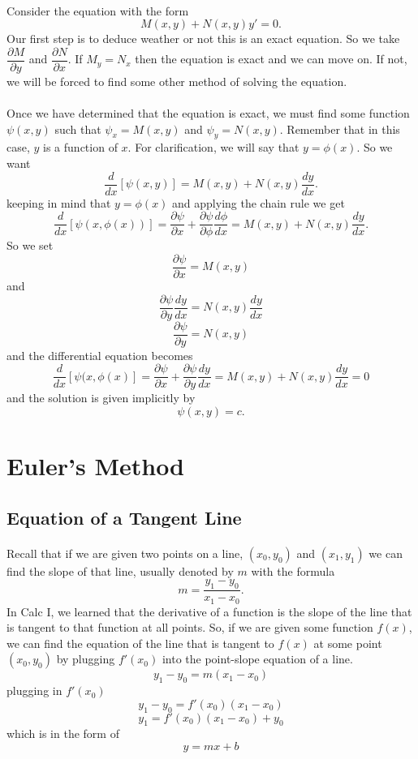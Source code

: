 \documentclass[font =22]{report}
\begin{document}
\paragraph{}
Consider the equation with the form 
\[
M(x,y) + N(x,y)y' = 0.
\]
Our first step is to deduce weather or not this is an exact equation. So we take
$\dfrac{\partial M}{\partial y}$ and $\dfrac{\partial N}{\partial x}$. If $M_y = N_x$ then the equation is exact and we can move on. If not, we will be forced to find some other method of solving the equation.  

\paragraph{}
Once we have determined that the equation is exact, we must find some function $\psi(x,y)$ such that $\psi_x = M(x,y)$ and $\psi_y = N(x,y)$. Remember that in this case, $y$ is a function of $x$. For clarification, we will say that $y=\phi(x)$. So we want 
\[
\frac{d}{dx}\left[\psi(x,y)\right] = M(x,y) + N(x,y)\frac{dy}{dx}.
\]
keeping in mind that $y = \phi(x)$ and applying the chain rule we get
\[
\frac{d}{dx}\left[\psi(x,\phi(x))\right] = \frac{\partial \psi}{\partial x} + \frac{\partial \psi}{\partial \phi}\frac{d \phi}{dx} = M(x,y) + N(x,y)\frac{dy}{dx}.
\]
So we set 
\[
\frac{\partial \psi}{\partial x} = M(x,y)
\]
and 
\[
\frac{\partial \psi}{\partial y}\frac{dy}{dx} = N(x,y)\frac{dy}{dx}
\]
\[
\frac{\partial \psi}{\partial y} = N(x,y)
\]
and the differential equation becomes
\[
\frac{d}{dx}\left[\psi(x,\phi(x)\right] = \frac{\partial \psi}{\partial x} + \frac{\partial \psi}{\partial y}\frac{dy}{dx} = M(x,y) + N(x,y)\frac{dy}{dx} =0
\]
and the solution is given implicitly by 
\[
\psi(x,y) = c. 
\]


\section{Euler's Method}
\subsection{Equation of a Tangent Line}
\paragraph{}
Recall that if we are given two points on a line, $(x_0,y_0)$ and $(x_1,y_1)$ we can find the slope of that line, usually denoted by $m$ with the formula 
\[
m= \frac{y_1-y_0}{x_1-x_0}.
\]
In Calc I, we learned that the derivative of a function is the slope of the line that is tangent to that function at all points. So, if we are given some function $f(x)$, we can find the equation of the line that is tangent to $f(x)$ at some point $(x_0,y_0)$ by plugging $f'(x_0)$ into the point-slope equation of a line.  
\[
y_1-y_0 = m(x_1-x_0)
\]
plugging in $f'(x_0)$
\[
y_1 - y_0 = f'(x_0)(x_1-x_0)
\]
\[
y_1 = f'(x_0)(x_1-x_0)+y_0
\]
which is in the form of 
\[
y=mx+b
\]
\end{document}
